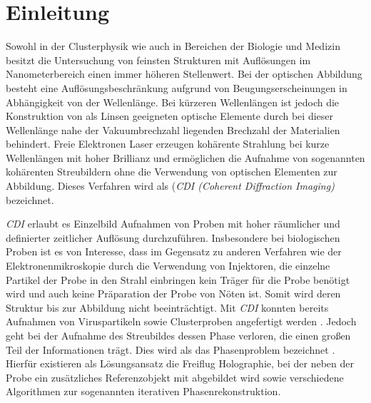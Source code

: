 \chapter{Einleitung}
Sowohl in der Clusterphysik wie auch in Bereichen der Biologie und Medizin besitzt die Untersuchung von feinsten Strukturen mit Auflösungen im Nanometerbereich einen immer höheren Stellenwert. Bei der optischen Abbildung besteht eine Auflösungsbeschränkung aufgrund von Beugungserscheinungen in Abhängigkeit von der Wellenlänge. Bei kürzeren Wellenlängen ist jedoch die Konstruktion von als Linsen geeigneten optische Elemente durch bei dieser Wellenlänge nahe der Vakuumbrechzahl liegenden Brechzahl der Materialien behindert.
Freie Elektronen Laser erzeugen kohärente Strahlung bei kurze Wellenlängen mit hoher Brillianz und ermöglichen die Aufnahme von sogenannten kohärenten Streubildern ohne die Verwendung von optischen Elementen zur Abbildung. Dieses Verfahren wird als (\textit{CDI (Coherent Diffraction Imaging)} bezeichnet\cite{schultz2013chapter7}.

\textit{CDI} erlaubt es Einzelbild Aufnahmen von Proben mit hoher räumlicher und definierter zeitlicher Auflösung durchzuführen. Insbesondere bei biologischen Proben ist es von Interesse, dass im Gegensatz zu anderen Verfahren wie der Elektronenmikroskopie durch die Verwendung von Injektoren, die einzelne Partikel der Probe in den Strahl einbringen kein Träger für die Probe benötigt wird und auch keine Präparation der Probe von Nöten ist. Somit wird deren Struktur bis zur Abbildung nicht beeinträchtigt. Mit \textit{CDI} konnten bereits Aufnahmen von Viruspartikeln sowie Clusterproben angefertigt werden \cite{seibert2011}. Jedoch geht bei der Aufnahme des Streubildes dessen Phase verloren, die einen großen Teil der Informationen trägt. Dies wird als das Phasenproblem bezeichnet \cite{shechtman2015}. Hierfür existieren als Lösungsansatz die Freiflug Holographie, bei der neben der Probe ein zusätzliches Referenzobjekt mit abgebildet wird sowie verschiedene Algorithmen zur sogenannten  iterativen Phasenrekonstruktion.

